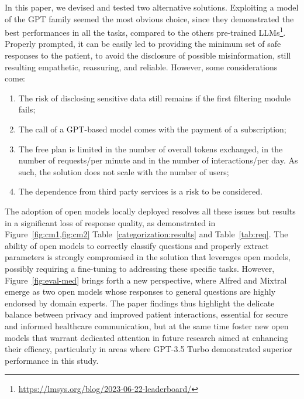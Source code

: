 In this paper, we devised and tested two alternative solutions. 
%
Exploiting a model of the GPT family seemed the most obvious choice, since they demonstrated the best performances in all the tasks, compared to the others pre-trained LLMs\footnote{\url{https://lmsys.org/blog/2023-06-22-leaderboard/}}.
%
Properly prompted, it can be easily led to providing the minimum set of safe responses %
to the patient, to avoid the disclosure of possible misinformation, still resulting empathetic, reassuring, and reliable.
%
However, some considerations come: 
\begin{enumerate}
    \item The risk of disclosing sensitive data still remains if the first filtering module fails;
    \item The call of a GPT-based model comes with the payment of a subscription;
    \item The free plan is limited in the number of overall tokens exchanged, in the number of requests/per minute and in the number of interactions/per day. As such, the solution does not scale with the number of users;   
    \item The dependence from third party services is a risk to be considered.
\end{enumerate}
%
\noindent The adoption of open models locally deployed resolves all these issues but results in a significant loss of response quality, as demonstrated in~
Figure~\ref{fig:cm1,fig:cm2} Table~\ref{categorization:results} and Table~\ref{tab:req}. 
%
The ability of open models to correctly classify questions and properly extract parameters is strongly compromised in the solution that leverages open models, possibly requiring a fine-tuning to addressing these specific tasks.
%
However, Figure~\ref{fig:eval-med} brings forth a new perspective, where Alfred and Mixtral emerge as two open models whose responses to general questions are highly endorsed by domain experts. 
%
The paper findings thus highlight the delicate balance between privacy and improved patient interactions, essential for secure and informed healthcare communication, but at the same time foster new open models that warrant dedicated attention in future research aimed at enhancing their efficacy, particularly in areas where GPT-3.5 Turbo demonstrated superior performance in this study.

